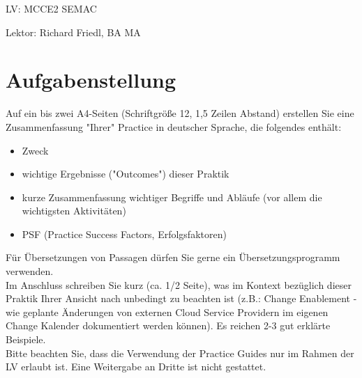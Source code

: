 \noindent LV: MCCE2 SEMAC

\noindent Lektor: Richard Friedl, BA MA

\section{Aufgabenstellung}
Auf ein bis zwei A4-Seiten (Schriftgröße 12, 1,5 Zeilen Abstand) erstellen Sie eine Zusammenfassung "Ihrer" Practice in deutscher Sprache, die folgendes enthält: 

\begin{itemize}
	\item Zweck
	\item wichtige Ergebnisse ("Outcomes") dieser Praktik 
	\item kurze Zusammenfassung wichtiger Begriffe und Abläufe (vor allem die wichtigsten Aktivitäten)
	\item PSF (Practice Success Factors, Erfolgsfaktoren)
\end{itemize}

\noindent
Für Übersetzungen von Passagen dürfen Sie gerne ein Übersetzungsprogramm verwenden. \\

\noindent
Im Anschluss schreiben Sie kurz (ca. 1/2 Seite), was im Kontext bezüglich dieser Praktik Ihrer Ansicht nach unbedingt zu beachten ist (z.B.: Change Enablement - wie geplante Änderungen von externen Cloud Service Providern im eigenen Change Kalender dokumentiert werden können). Es reichen 2-3 gut erklärte Beispiele. \\

\noindent
Bitte beachten Sie, dass die Verwendung der Practice Guides nur im Rahmen der LV erlaubt ist. Eine Weitergabe an Dritte ist nicht gestattet. 

\clearpage